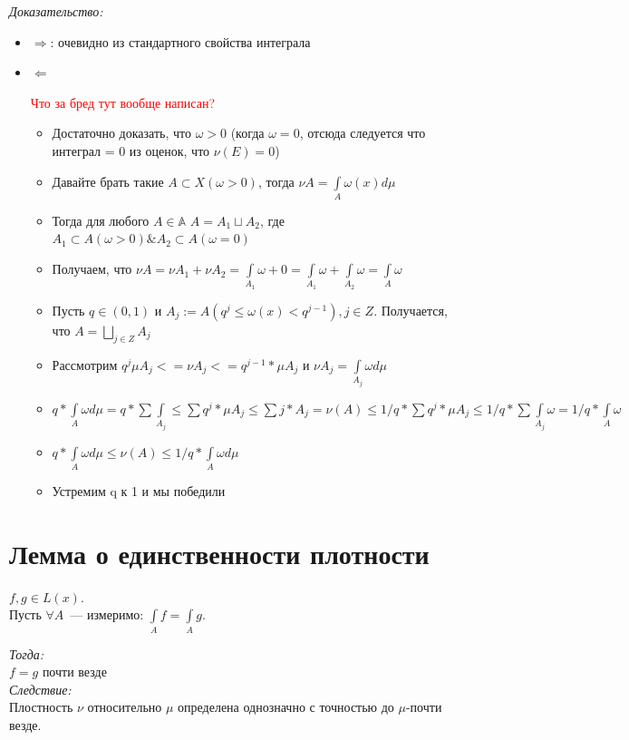 \documentclass[paper=a4, fontsize=17pt]{article}
\begin{document}
	\emph{Доказательство:}
	 	\begin{itemize}
	 		\item $\Rightarrow$: очевидно из стандартного свойства интеграла
	 		\item $\Leftarrow$\par
	 		\textcolor{red}{Что за бред тут вообще написан?}
	 		\begin{itemize}
	 			\item
	 			Достаточно доказать, что $\omega > 0$ (когда $\omega = 0$, отсюда следуется что интеграл = 0 из оценок, что $\nu(E) = 0$)
	 			\item
	 			Давайте брать такие $A \subset X(\omega > 0)$, тогда $\nu A = \int\limits_A \omega(x) d\mu$
	 			\item
	 			Тогда для любого $A\in\mathbb{A}$ $A = A_1 \sqcup A_2$, где $A_1 \subset A(\omega > 0) \& A_2 \subset A(\omega = 0)$
	 			\item
	 			Получаем, что $\nu A = \nu A_1 + \nu A_2  = \int\limits_{A_1}\omega + 0 = \int\limits_{A_1}\omega + \int\limits_{A_2}\omega = \int\limits_{A}\omega$
	 			\item
	 			Пусть $q\in(0, 1)$ и $A_j:=A(q^j \leq \omega(x) < q^{j - 1}), j \in Z$. Получается, что $A = \bigsqcup_{j \in Z} A_j$
	 			\item
	 			Рассмотрим $q^j \mu A_j <= \nu A_j <= q^{j - 1} * \mu A_j$ и $\nu A_j = \int\limits_{A_j}\omega d\mu$
	 			\item
	 			$q * \int\limits_A \omega d\mu = q * \sum \int\limits_{A_j} \leq \sum q^j * \mu A_j \leq \sum j * A_j = \nu(A) \leq 1 / q * \sum q^j * \mu A_j \leq 1 / q * \sum \int\limits_{A_j} \omega = 1 /q * \int\limits_A \omega$
	 			\item
	 			$q * \int\limits_A \omega d\mu \leq \nu(A) \leq 1 / q * \int\limits_A \omega d\mu$
	 			\item
	 			Устремим q к 1 и мы победили
	 		\end{itemize}
	 	\end{itemize}

\section{Лемма о единственности плотности}
	$f, g \in L(x)$. \\
	Пусть $\forall A$~--- измеримо: $\int\limits_A f = \int\limits_A g$.

	\emph{Тогда: } \\
		$f = g$ почти везде \\
	\emph{Следствие: } \\
		Плостность $\nu$ относительно $\mu$ определена однозначно с точностью до $\mu$-почти везде.
\end{document}
